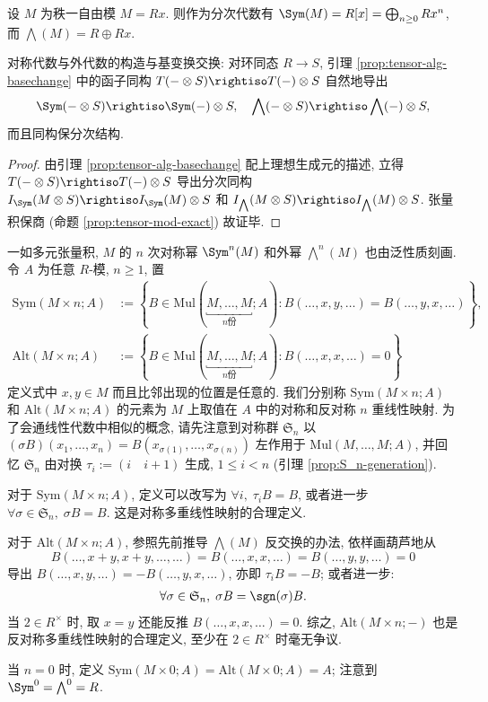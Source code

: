 \begin{example}\label{eg:Sym-wedge-rank1}
	设 $M$ 为秩一自由模 $M = Rx$. 则作为分次代数有 $\Sym(M) = R[x] = \bigoplus_{n \geq 0} R x^n$, 而 $\bigwedge(M) = R \oplus Rx$.
\end{example}

\begin{lemma}
	对称代数与外代数的构造与基变换交换: 对环同态 $R \to S$, 引理 \ref{prop:tensor-alg-basechange} 中的函子同构 $T(- \otimes S) \rightiso T(-) \otimes S$ 自然地导出
	\[ \Sym(- \otimes S) \rightiso \Sym(-) \otimes S, \quad \bigwedge(- \otimes S) \rightiso \bigwedge(-) \otimes S, \]
	而且同构保分次结构.
\end{lemma}
\begin{proof}
	由引理 \ref{prop:tensor-alg-basechange} 配上理想生成元的描述, 立得 $T(- \otimes S) \rightiso T(-) \otimes S$ 导出分次同构 $I_{\Sym}(M \otimes S) \rightiso I_{\Sym}(M) \otimes S$ 和 $I_{\bigwedge}(M \otimes S) \rightiso I_{\bigwedge}(M) \otimes S$. 张量积保商 (命题 \ref{prop:tensor-mod-exact}) 故证毕.
\end{proof}

一如多元张量积, $M$ 的 $n$ 次对称幂 $\Sym^n(M)$ 和外幂 $\bigwedge^n(M)$ 也由泛性质刻画. 令 $A$ 为任意 $R$-模, $n \geq 1$, 置
\begin{align*}
	\text{Sym}(M \times n; A) & := \left\{ B \in \text{Mul}(\underbracket{M, \ldots, M}_{n \text{份}}; A) : B(\ldots, x,y, \ldots) = B(\ldots, y,x, \ldots) \right\}, \\
	\text{Alt}(M \times n; A) & := \left\{ B \in \text{Mul}(\underbracket{M, \ldots, M}_{n \text{份}}; A) : B(\ldots, x,x, \ldots)=0 \right\}
\end{align*}
定义式中 $x,y \in M$ 而且比邻出现的位置是任意的. 我们分别称 $\text{Sym}(M \times n; A)$ 和 $\text{Alt}(M \times n; A)$ 的元素为 $M$ 上取值在 $A$ 中的对称和反对称 $n$ 重线性映射. 为了会通线性代数中相似的概念, 请先注意到对称群 $\mathfrak{S}_n$ 以 $(\sigma B)(x_1, \ldots, x_n) = B(x_{\sigma(1)}, \ldots, x_{\sigma(n)})$ 左作用于 $\text{Mul}(M, \ldots, M; A)$, 并回忆 $\mathfrak{S}_n$ 由对换 $\tau_i := (i \quad i+1)$ 生成, $1 \leq i < n$ (引理 \ref{prop:S_n-generation}).
\begin{compactitem}
	\item 对于 $\text{Sym}(M \times n; A)$, 定义可以改写为 $\forall i, \;\tau_i B = B$, 或者进一步 $\forall \sigma \in \mathfrak{S}_n,\; \sigma B =B$. 这是对称多重线性映射的合理定义.
	\item 对于 $\text{Alt}(M \times n; A)$, 参照先前推导 $\bigwedge(M)$ 反交换的办法, 依样画葫芦地从
	\[ B(\ldots, x+y, x+y, \ldots, \ldots) = B(\ldots, x,x, \ldots) = B(\ldots, y,y, \ldots) = 0\]
	导出 $B(\ldots, x,y, \ldots) = -B(\ldots, y,x, \ldots)$, 亦即 $\tau_i B = -B$; 或者进一步:
		\begin{gather*}
			\forall \sigma \in \mathfrak{S}_n,\; \sigma B = \sgn(\sigma)B.
		\end{gather*}
		当 $2 \in R^\times$ 时, 取 $x=y$ 还能反推 $B(\ldots, x,x, \ldots)=0$. 综之, $\text{Alt}(M \times n; -)$ 也是反对称多重线性映射的合理定义, 至少在 $2 \in R^\times$ 时毫无争议.
\end{compactitem}
当 $n=0$ 时, 定义 $\text{Sym}(M \times 0; A) = \text{Alt}(M \times 0; A) = A$; 注意到 $\Sym^0 = \bigwedge^0 = R$.

